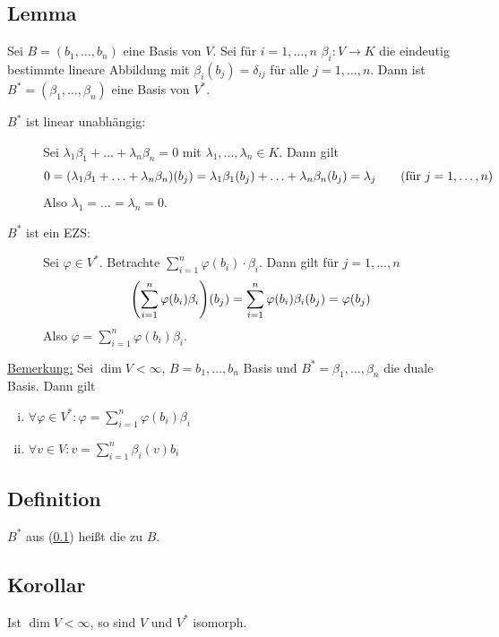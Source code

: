 \subsection[Lemma: Basis des Dualraums]{Lemma} %
\label{sub:122}
Sei $B=(b_1, \ldots , b_n)$ eine Basis von $V$. Sei für $i=1, \ldots ,n$ $\beta_i : V \to K$ die eindeutig bestimmte lineare Abbildung mit 
$\beta_i (b_j) = \delta_{ij}$ für alle $j=1, \ldots ,n$. Dann ist $B^* = (\beta_1, \ldots , \beta_n)$ eine Basis von $V^*$.
\begin{description}
	\item[$B^*$ ist linear unabhängig:] Sei $\lambda_1 \beta_1 + \ldots + \lambda_n \beta_n=0$ mit $\lambda_1, \ldots , \lambda_n \in K$. Dann gilt
	\[
		0=\enbrace*{\lambda_1 \beta_1 + \ldots + \lambda_n \beta_n} (b_j) = \lambda_1 \beta_1(b_j) + \ldots + \lambda_n \beta_n (b_j) = \lambda_j \tag{für $j=1, \ldots ,n$}
	\]
	Also $\lambda_1 = \ldots = \lambda_n =0$. 
	\item[$B^*$ ist ein EZS:] Sei $\varphi \in V^*$. Betrachte $\sum_{i=1}^{n} \varphi (b_i) \cdot \beta_i$. Dann gilt für $j=1, \ldots ,n$
	\[
		\enbrace*{\sum_{i=1}^{n}  \varphi(b_i) \beta_i} (b_j) = \sum_{i=1}^{n} \varphi(b_i) \beta_i (b_j) = \varphi(b_j) 
	\]
	Also $\varphi = \sum_{i=1}^{n} \varphi(b_i) \beta_i$. \bewende
\end{description}
\uline{Bemerkung:} Sei $\dim V < \infty$, $B=b_1, \ldots ,b_n$ Basis und $B^* =\beta_1 , \ldots , \beta_n$ die duale Basis. Dann gilt
\begin{enumerate}[(i)]
	\item $\forall \varphi\in V^* : \varphi = \sum_{i=1}^{n} \varphi(b_i) \beta_i$
	\item $\forall v \in V : v = \sum_{i=1}^{n} \beta_i (v) b_i$ 
\end{enumerate}

\subsection[Definition: Duale Basis]{Definition} %
\label{sub:123}
$B^*$ aus (\ref{sub:122}) heißt die  zu $B$. 

\subsection[Korollar: Isomorphismus zwischen  endlich dimensionalem Vektorraum und seinem Dualraum]{Korollar} %
\label{sub:124}
Ist $\dim V < \infty$, so sind $V$ und $V^*$ isomorph.

